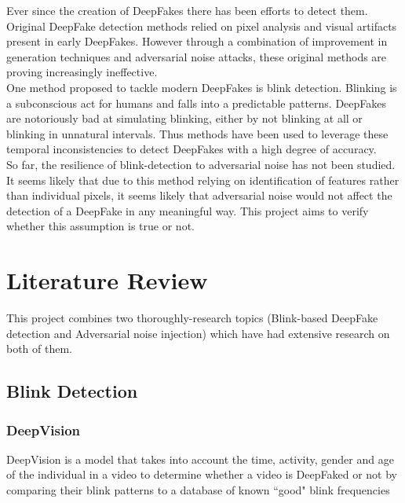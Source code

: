 \documentclass{article}
\begin{document}
Ever since the creation of DeepFakes there has been efforts to detect them. Original DeepFake detection methods relied on pixel analysis and visual artifacts present in early DeepFakes\cite{yu2021survey}. However through a combination of improvement in generation techniques and adversarial noise attacks\cite{huang2020fakeretouch}\cite{pertubations}, these original methods are proving increasingly ineffective.\\

One method proposed to tackle modern DeepFakes is blink detection. Blinking is a subconscious act for humans and falls into a predictable patterns. DeepFakes are notoriously bad at simulating blinking, either by not blinking at all or blinking in unnatural intervals. Thus methods have been used to leverage these temporal inconsistencies to detect DeepFakes with a high degree of accuracy\cite{blinking-pattern}.\\

So far, the resilience of blink-detection to adversarial noise has not been studied. It seems likely that due to this method relying on identification of features rather than individual pixels, it seems likely that adversarial noise would not affect the detection of a DeepFake in any meaningful way. This project aims to verify whether this assumption is true or not.

\section{Literature Review}

This project combines two thoroughly-research topics (Blink-based DeepFake detection and Adversarial noise injection) which have had extensive research on both of them.

\subsection{Blink Detection}
\subsubsection{DeepVision}

DeepVision\cite{blinking-pattern} is a model that takes into account the time, activity, gender and age of the individual in a video to determine whether a video is DeepFaked or not by comparing their blink patterns to a database of known ``good" blink frequencies\\
\end{document}
